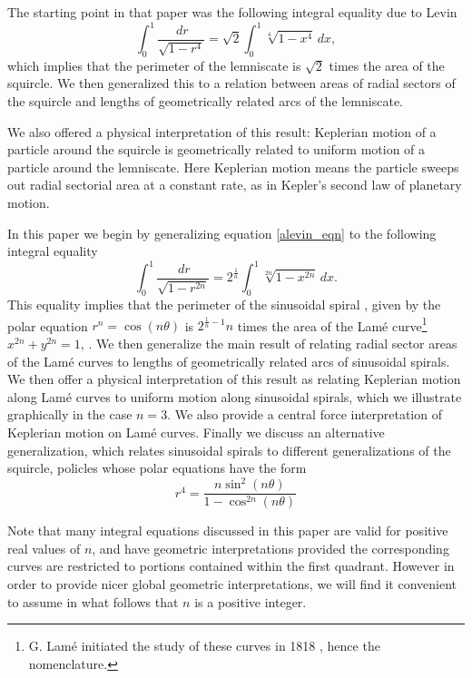 \documentclass{amsart}
\theoremstyle{definition}
\begin{document}
The starting point in that paper was the following integral equality due to Levin \cite{alevin}
\begin{equation}
\int_0^1\frac{\,dr}{\sqrt{1-r^4}}=\sqrt{2}\int_0^1\sqrt[4]{1-x^4}\,dx,\label{alevin_eqn}
\end{equation}
which implies that the perimeter of the lemniscate is $\sqrt{2}$ times the area of the squircle. We then generalized
this to a relation between areas of radial sectors of the squircle and lengths of geometrically related arcs of the
lemniscate.

We also offered a physical interpretation of this result: Keplerian motion of a particle around the squircle
is geometrically related to uniform motion of a particle around the lemniscate. Here Keplerian motion means the
particle sweeps out radial sectorial area at a constant rate, as in Kepler's second law of planetary motion.

In this paper we begin by generalizing equation \eqref{alevin_eqn} to the following integral equality
\begin{equation}
\int_0^1\frac{\,dr}{\sqrt{1-r^{2n}}}=2^{\frac{1}{n}}\int_0^1\sqrt[2n]{1-x^{2n}}\,dx.\label{eqn2}
\end{equation}
This equality implies that the perimeter of the sinusoidal spiral \cite{Wikipedia:sinusoidal_spiral}, given by the polar equation $r^n=\cos(n\theta)$
is $2^{\frac{1}{n}-1}n$ times the area of the Lam\'e curve\footnote{G. Lam\'e initiated the study of these curves in 1818  \cite[p. 105]{lame}, hence
the nomenclature.} ${x^{2n}+y^{2n}=1}$, \cite{Wikipedia:superellipse}.
We then generalize the main result of \cite{Fiedorowicz-Ramalingam} relating radial sector areas of the Lam\'e curves to lengths of geometrically
related arcs of sinusoidal spirals. We then offer a physical interpretation of this result as relating Keplerian motion
along Lam\'e curves to uniform motion along sinusoidal spirals, which we illustrate graphically in the case $n=3$. We
also provide a central force interpretation of Keplerian motion on Lam\'e curves. 
Finally we discuss an alternative
generalization, which relates sinusoidal spirals to different generalizations of the squircle, policles whose polar equations
have the form
\begin{equation}
r^4=\frac{n\sin^2(n\theta)}{1-\cos^{2n}(n\theta)}
\end{equation}

Note that many integral equations discussed in this paper are valid for positive real values of $n$, and have geometric
interpretations provided the corresponding curves are restricted to portions contained within the first quadrant. However
in order to provide nicer global geometric interpretations, we will find it convenient to assume in what follows that $n$ is a
positive integer.
\end{document}
